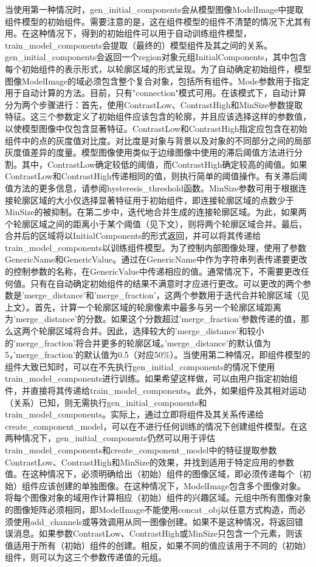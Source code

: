 \documentclass{article}
\begin{document}
当使用第一种情况时，gen\_initial\_components会从模型图像ModelImage中提取组件模型的初始组件。需要注意的是，这在组件模型的组件不清楚的情况下尤其有用。在这种情况下，得到的初始组件可以用于自动训练组件模型，train\_model\_components会提取（最终的）模型组件及其之间的关系。gen\_initial\_components会返回一个region对象元组InitialComponents，其中包含每个初始组件的表示形式，以轮廓区域的形式呈现。为了自动确定初始组件，模型图像ModelImage的域必须包含整个复合对象，包括所有组件。Mode参数用于指定用于自动计算的方法。目前，只有"connection"模式可用。在该模式下，自动计算分为两个步骤进行：首先，使用ContrastLow、ContrastHigh和MinSize参数提取特征。这三个参数定义了初始组件应该包含的轮廓，并且应该选择这样的参数值，以使模型图像中仅包含显著特征。ContrastLow和ContrastHigh指定应包含在初始组件中的点的灰度值对比度。对比度是对象与背景以及对象的不同部分之间的局部灰度值差异的度量。模型图像使用类似于边缘图像中使用的滞后阈值方法进行分割。其中，ContrastLow确定较低的阈值，而ContrastHigh确定较高的阈值。如果ContrastLow和ContrastHigh传递相同的值，则执行简单的阈值操作。有关滞后阈值方法的更多信息，请参阅hysteresis\_threshold函数。MinSize参数可用于根据连接轮廓区域的大小仅选择显著特征用于初始组件，即连接轮廓区域的点数少于MinSize的被抑制。在第二步中，迭代地合并生成的连接轮廓区域。为此，如果两个轮廓区域之间的距离小于某个阈值（见下文），则将两个轮廓区域合并。最后，合并后的区域将以InitialComponents的形式返回，并可以将其传递给train\_model\_components以训练组件模型。为了控制内部图像处理，使用了参数GenericName和GenericValue。通过在GenericName中作为字符串列表传递要更改的控制参数的名称，在GenericValue中传递相应的值。通常情况下，不需要更改任何值。只有在自动确定初始组件的结果不满意时才应进行更改。可以更改的两个参数是'merge\_distance'和'merge\_fraction'，这两个参数用于迭代合并轮廓区域（见上文）。首先，计算一个轮廓区域的轮廓像素中最多与另一个轮廓区域距离为'merge\_distance'的分数。如果这个分数超过'merge\_fraction'参数传递的值，那么这两个轮廓区域将合并。因此，选择较大的'merge\_distance'和较小的'merge\_fraction'将合并更多的轮廓区域。'merge\_distance'的默认值为5，'merge\_fraction'的默认值为0.5（对应50\%）。当使用第二种情况，即组件模型的组件大致已知时，可以在不先执行gen\_initial\_components的情况下使用train\_model\_components进行训练。如果希望这样做，可以由用户指定初始组件，并直接将其传递给train\_model\_components。此外，如果组件及其相对运动（关系）已知，则无需执行gen\_initial\_components和train\_model\_components。实际上，通过立即将组件及其关系传递给create\_component\_model，可以在不进行任何训练的情况下创建组件模型。在这两种情况下，gen\_initial\_components仍然可以用于评估train\_model\_components和create\_component\_model中的特征提取参数ContrastLow、ContrastHigh和MinSize的效果，并找到适用于特定应用的参数值。在这种情况下，必须明确给出（初始）组件的图像区域，即必须传递每个（初始）组件应该创建的单独图像。在这种情况下，ModelImage包含多个图像对象。将每个图像对象的域用作计算相应（初始）组件的兴趣区域。元组中所有图像对象的图像矩阵必须相同，即ModelImage不能使用concat\_obj以任意方式构造，而必须使用add\_channels或等效调用从同一图像创建。如果不是这种情况，将返回错误消息。如果参数ContrastLow、ContrastHigh或MinSize只包含一个元素，则该值适用于所有（初始）组件的创建。相反，如果不同的值应该用于不同的（初始）组件，则可以为这三个参数传递值的元组。
\end{document}
